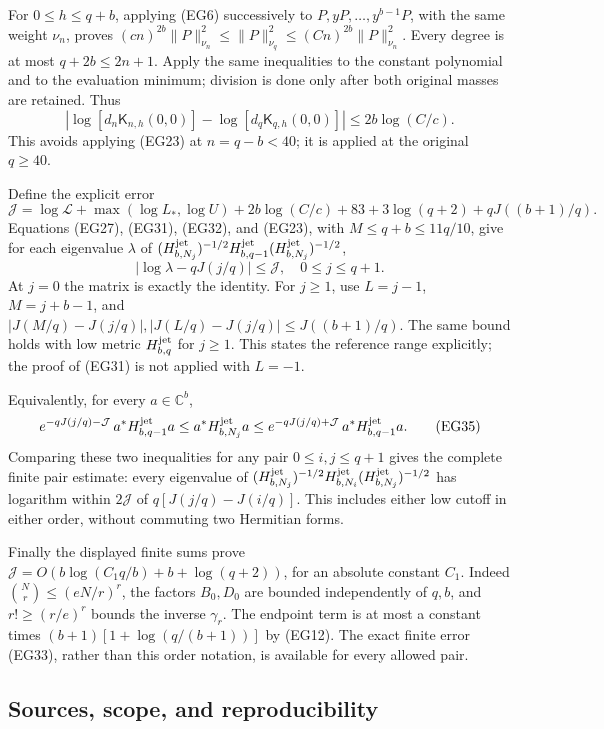 \documentclass[10pt]{article}
\begin{document}
For \(0\le h\le q+b\), applying (EG6) successively to \(P,yP,\ldots,y^{b-1}P\), with the same weight \(\nu_n\), proves \((cn)^{2b}\|P\|_{\nu_n}^2\le\|P\|_{\nu_q}^2\le(Cn)^{2b}\|P\|_{\nu_n}^2\). Every degree is at most \(q+2b\le2n+1\). Apply the same inequalities to the constant polynomial and to the evaluation minimum; division is done only after both original masses are retained. Thus \[
 |\log[d_n\mathsf K_{n,h}(0,0)]-\log[d_q\mathsf K_{q,h}(0,0)]|
 \le2b\log(C/c).
 \tag{EG32}
\] This avoids applying (EG23) at \(n=q-b<40\); it is applied at the original \(q\ge40\).

Define the explicit error \[
 \mathcal J=\log\mathcal L+\max(\log L_*,\log U)+2b\log(C/c)
 +83+3\log(q+2)+qJ((b+1)/q).
 \tag{EG33}
\] Equations (EG27), (EG31), (EG32), and (EG23), with \(M\le q+b\le11q/10\), give for each eigenvalue \(\lambda\) of \((H^{\rm jet}_{b,N_j})^{-1/2}H^{\rm jet}_{b,q-1}(H^{\rm jet}_{b,N_j})^{-1/2}\), \[
 \boxed{|\log\lambda-qJ(j/q)|\le\mathcal J,\quad0\le j\le q+1.}
 \tag{EG34}
\] At \(j=0\) the matrix is exactly the identity. For \(j\ge1\), use \(L=j-1\), \(M=j+b-1\), and \(|J(M/q)-J(j/q)|,|J(L/q)-J(j/q)|\le J((b+1)/q)\). The same bound holds with low metric \(H^{\rm jet}_{b,q}\) for \(j\ge1\). This states the reference range explicitly; the proof of (EG31) is not applied with \(L=-1\).

Equivalently, for every \(a\in\mathbb C^b\), \[
 e^{-qJ(j/q)-\mathcal J}\,a^*H^{\rm jet}_{b,q-1}a
 \le a^*H^{\rm jet}_{b,N_j}a
 \le e^{-qJ(j/q)+\mathcal J}\,a^*H^{\rm jet}_{b,q-1}a.
 \tag{EG35}
\] Comparing these two inequalities for any pair \(0\le i,j\le q+1\) gives the complete finite pair estimate: every eigenvalue of \((H^{\rm jet}_{b,N_j})^{-1/2}H^{\rm jet}_{b,N_i}(H^{\rm jet}_{b,N_j})^{-1/2}\) has logarithm within \(2\mathcal J\) of \(q[J(j/q)-J(i/q)]\). This includes either low cutoff in either order, without commuting two Hermitian forms.

Finally the displayed finite sums prove \(\mathcal J=O(b\log(C_1q/b)+b+\log(q+2))\), for an absolute constant \(C_1\). Indeed \(\binom Nr\le(eN/r)^r\), the factors \(B_0,D_0\) are bounded independently of \(q,b\), and \(r!\ge(r/e)^r\) bounds the inverse \(\gamma_r\). The endpoint term is at most a constant times \((b+1)[1+\log(q/(b+1))]\) by (EG12). The exact finite error (EG33), rather than this order notation, is available for every allowed pair.

\subsection{Sources, scope, and reproducibility}\label{sources-scope-and-reproducibility}
\end{document}
